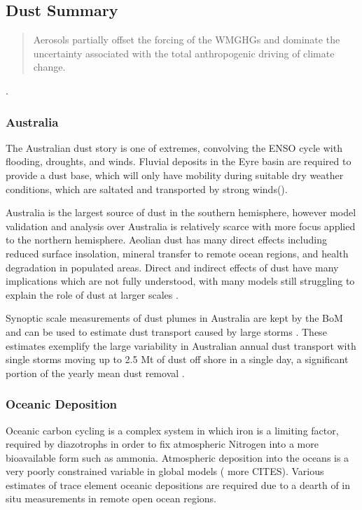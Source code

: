 \subsection{Dust Summary}
\begin{quote}
Aerosols partially offset the forcing of the WMGHGs and dominate the uncertainty associated with the total anthropogenic driving of climate change.
\end{quote} \cite{IPCC_2013_chap8}.
\subsubsection{Australia}

The Australian dust story is one of extremes, convolving the ENSO cycle with flooding, droughts, and winds.
Fluvial deposits in the Eyre basin are required to provide a dust base, which will only have mobility during suitable dry weather conditions, which are saltated and transported by strong winds(\cite{Zender_2003}).

Australia is the largest source of dust in the southern hemisphere, however model validation and analysis over Australia is relatively scarce with more focus applied to the northern hemisphere.
Aeolian dust has many direct effects including reduced surface insolation, mineral transfer to remote ocean regions, and health degradation in populated areas.
Direct and indirect effects of dust have many implications which are not fully understood, with many models still struggling to explain the role of dust at larger scales \cite{Rotstayn_2011}.

Synoptic scale measurements of dust plumes in Australia are kept by the BoM and can be used to estimate dust transport caused by large storms \cite{Leys_2011}. 
These estimates exemplify the large variability in Australian annual dust transport with single storms moving up to 2.5 Mt of dust off shore in a single day, a significant portion of the yearly mean dust removal \cite{Leys_2011,Shao_2007}.

\subsubsection{Oceanic Deposition}
Oceanic carbon cycling is a complex system in which iron is a limiting factor, required by diazotrophs in order to fix atmospheric Nitrogen into a more bioavailable form such as ammonia.
Atmospheric deposition into the oceans is a very poorly constrained variable in global models (\cite{Grand_2015} more CITES).
Various estimates of trace element oceanic depositions are required due to a dearth of in situ measurements in remote open ocean regions.


